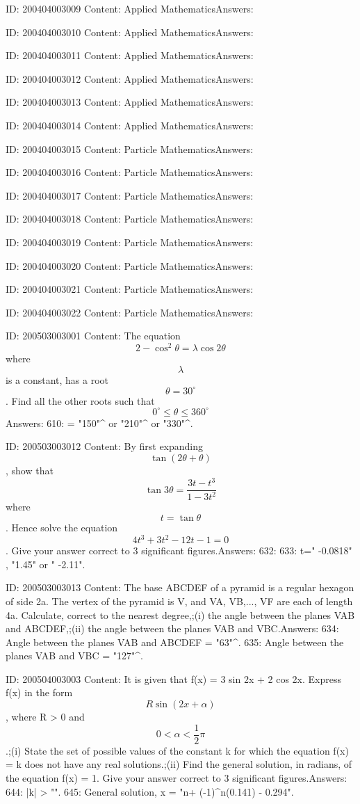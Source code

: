 \documentclass{article}
\begin{document}
ID: 200404003009
Content:
Applied MathematicsAnswers:

ID: 200404003010
Content:
Applied MathematicsAnswers:

ID: 200404003011
Content:
Applied MathematicsAnswers:

ID: 200404003012
Content:
Applied MathematicsAnswers:

ID: 200404003013
Content:
Applied MathematicsAnswers:

ID: 200404003014
Content:
Applied MathematicsAnswers:

ID: 200404003015
Content:
Particle MathematicsAnswers:

ID: 200404003016
Content:
Particle MathematicsAnswers:

ID: 200404003017
Content:
Particle MathematicsAnswers:

ID: 200404003018
Content:
Particle MathematicsAnswers:

ID: 200404003019
Content:
Particle MathematicsAnswers:

ID: 200404003020
Content:
Particle MathematicsAnswers:

ID: 200404003021
Content:
Particle MathematicsAnswers:

ID: 200404003022
Content:
Particle MathematicsAnswers:

ID: 200503003001
Content:
The equation $$2 - {\cos }^2 \theta = \lambda  \cos  2\theta$$ where $$\lambda$$  is a constant, has a root $$\theta = 30^{\circ}$$. Find all the other roots such that $$0^{\circ} \leq \theta \leq 360^{\circ}$$ Answers:
610: \theta = "150"^{\circ} or "210"^{\circ} or "330"^{\circ}.

ID: 200503003012
Content:
By first expanding $$\tan  ( 2\theta + \theta )$$, show that $$\tan  3\theta = \frac{3t - t^3}{1 - 3 t^2}$$ where $$t = \tan  \theta$$. Hence solve the equation $$4 t^3 + 3 t^2 - 12t - 1 = 0$$. Give your answer correct to 3 significant figures.Answers:
632: 
633: t=" -0.0818" , "1.45" or " -2.11".

ID: 200503003013
Content:
The base ABCDEF of a pyramid is a regular hexagon of side 2a. The vertex of the pyramid is V, and VA, VB,..., VF are each of length 4a. Calculate, correct to the nearest degree,;(i) the angle between the planes VAB and ABCDEF,;(ii) the angle between the planes VAB and VBC.Answers:
634: Angle between the planes VAB and ABCDEF = "63"^{\circ}.
635: Angle between the planes VAB and VBC = "127"^{\circ}.

ID: 200504003003
Content:
It is given that f(x) = 3 sin 2x + 2 cos 2x. Express f(x) in the form  $$R\sin ( 2x + \alpha )$$, where R > 0 and  $$0 < \alpha  < \frac{1}{2}\pi $$.;(i) State the set of possible values of the constant k for which the equation f(x) = k does not have any real solutions.;(ii) Find the general solution, in radians, of the equation f(x) = 1. Give your answer correct to 3 significant figures.Answers:
644:  |k| > "".
645: General solution, x = "n\pi + (-1)^n(0.141) - 0.294".
\end{document}
